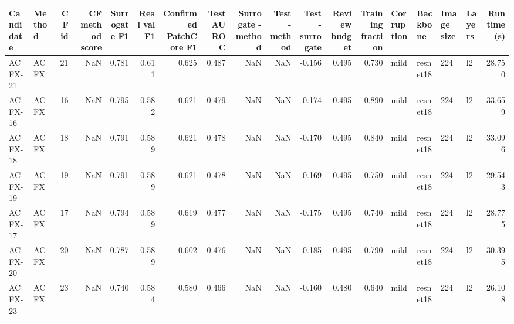 \begin{tabular}{llrrrrrrrrrrrllllr}
\toprule
Candidate & Method &  CF id &  CF method score &  Surrogate F1 &  Real val F1 &  Confirmed PatchCore F1 &  Test AUROC &  Surrogate - method &  Test - method &  Test - surrogate &  Review budget &  Training fraction & Corruption &        Backbone & Image size & Layers &  Runtime (s) \\
\midrule
  ACFX-21 &   ACFX &     21 &              NaN &         0.781 &        0.611 &                   0.625 &       0.487 &                 NaN &            NaN &            -0.156 &          0.495 &              0.730 &       mild &        resnet18 &        224 &     l2 &       28.750 \\
  ACFX-16 &   ACFX &     16 &              NaN &         0.795 &        0.582 &                   0.621 &       0.479 &                 NaN &            NaN &            -0.174 &          0.495 &              0.890 &       mild &        resnet18 &        224 &     l2 &       33.659 \\
  ACFX-18 &   ACFX &     18 &              NaN &         0.791 &        0.589 &                   0.621 &       0.478 &                 NaN &            NaN &            -0.170 &          0.495 &              0.840 &       mild &        resnet18 &        224 &     l2 &       33.096 \\
  ACFX-19 &   ACFX &     19 &              NaN &         0.791 &        0.589 &                   0.621 &       0.478 &                 NaN &            NaN &            -0.169 &          0.495 &              0.750 &       mild &        resnet18 &        224 &     l2 &       29.543 \\
  ACFX-17 &   ACFX &     17 &              NaN &         0.794 &        0.589 &                   0.619 &       0.477 &                 NaN &            NaN &            -0.175 &          0.495 &              0.740 &       mild &        resnet18 &        224 &     l2 &       28.775 \\
  ACFX-20 &   ACFX &     20 &              NaN &         0.787 &        0.589 &                   0.602 &       0.476 &                 NaN &            NaN &            -0.185 &          0.495 &              0.790 &       mild &        resnet18 &        224 &     l2 &       30.395 \\
  ACFX-23 &   ACFX &     23 &              NaN &         0.740 &        0.584 &                   0.580 &       0.466 &                 NaN &            NaN &            -0.160 &          0.480 &              0.640 &       mild &        resnet18 &        224 &     l2 &       26.108 \\

\end{tabular}
